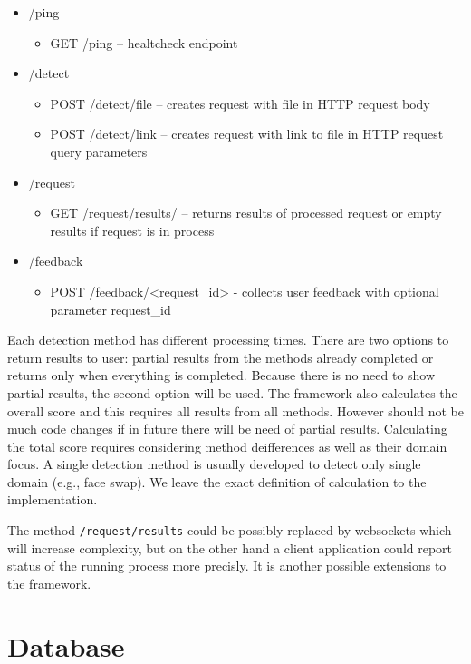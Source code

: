 \begin{itemize}
\item /ping
    \begin{itemize}
    \item GET /ping – healtcheck endpoint
    \end{itemize}
\item /detect
    \begin{itemize}
    \item POST /detect/file – creates request with file in HTTP request body
    \item POST /detect/link – creates request with link to file in HTTP request query parameters
    \end{itemize}
\item /request
    \begin{itemize}
    \item GET /request/results/ – returns results of processed request or empty results if request is in process
    \end{itemize}
\item /feedback
    \begin{itemize}
    \item POST /feedback/<request\_id> - collects user feedback with optional parameter request\_id
    \end{itemize}
\end{itemize}

Each detection method has different processing times. There are two options to return results to user: partial results from the methods already completed or returns only when everything is completed. Because there is no need to show partial results, the second option will be used. The framework also calculates the overall score and this requires all results from all methods. However should not be much code changes if in future there will be need of partial results. Calculating the total score requires considering method deifferences as well as their domain focus. A single detection method is usually developed to detect only single domain (e.g., face swap). We leave the exact definition of calculation to the implementation.

The method \texttt{/request/results} could be possibly replaced by websockets which will increase complexity, but on the other hand a client application could report status of the running process more precisly. It is another possible extensions to the framework.

\section{Database}

